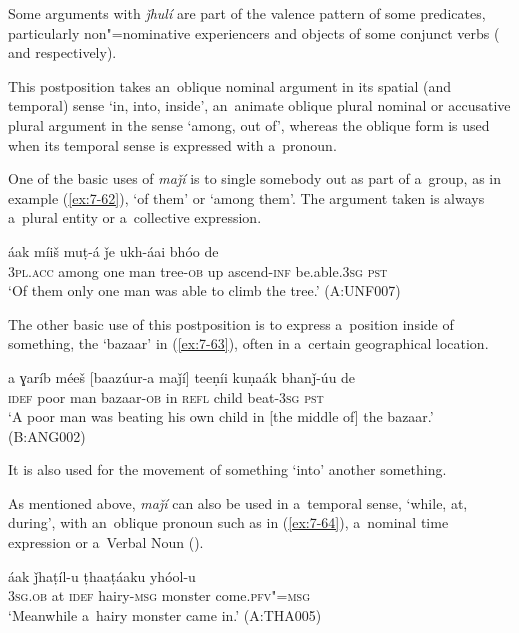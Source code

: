 Some arguments with \textit{ǰhulí} are part of the valence pattern of some predicates, particularly non"=nominative experiencers and objects of some conjunct verbs ( and  respectively).


 This postposition takes an~oblique nominal argument in its spatial (and temporal) sense `in, into, inside', an~animate oblique plural nominal or accusative plural argument in the sense `among, out of', whereas the oblique form is used when its temporal sense is expressed with a~pronoun. 


One of the basic uses of \textit{maǰí} is to single somebody out as part of a~group, as in example (\ref{ex:7-62}), `of them' or `among them'. The argument taken is always a~plural entity or a~collective expression.

\begin{exe}
\ex
\label{ex:7-62}
 áak míiš muṭ-á ǰe ukh-áai bhóo de \\
\textsc{3pl.acc} among one man tree-\textsc{ob} up ascend-\textsc{inf}  be.able.\textsc{3sg} \textsc{pst} \\
\glt `Of them only one man was able to climb the tree.' (A:UNF007)
\end{exe}

The other basic use of this postposition is to express a~position inside of something, the `bazaar' in (\ref{ex:7-63}), often in a~certain geographical location.

\begin{exe}
\ex
\label{ex:7-63}
\gll a ɣaríb méeš [baazúur-a maǰí] teeṇíi kuṇaák bhanǰ-úu de \\
\textsc{idef} poor man bazaar-\textsc{ob} in \textsc{refl} child beat-\textsc{3sg} \textsc{pst} \\
\glt `A poor man was beating his own child in [the middle of] the bazaar.' (B:ANG002)
\end{exe}

It is also used for the movement of something `into' another something.


As mentioned above, \textit{maǰí} can also be used in a~temporal sense, `while, at, during', with an~oblique pronoun such as in (\ref{ex:7-64}), a~nominal time expression or a~Verbal Noun ().

\begin{exe}
\ex
\label{ex:7-64}
 áak ǰhaṭíl-u ṭhaaṭáaku yhóol-u \\
\textsc{3sg.ob} at \textsc{idef} hairy-\textsc{msg} monster come.\textsc{pfv"=msg} \\
\glt `Meanwhile a~hairy monster came in.' (A:THA005)
\end{exe}

